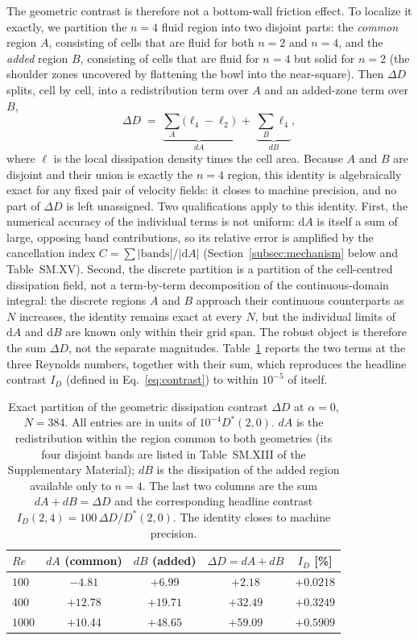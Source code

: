 The geometric contrast is therefore not a bottom-wall friction effect. To localize it exactly, we partition the $n=4$ fluid region into two disjoint parts: the \emph{common} region $A$, consisting of cells that are fluid for both $n=2$ and $n=4$, and the \emph{added} region $B$, consisting of cells that are fluid for $n=4$ but solid for $n=2$ (the shoulder zones uncovered by flattening the bowl into the near-square). Then $\Delta D$ splits, cell by cell, into a redistribution term over $A$ and an added-zone term over $B$,
\begin{equation}
\Delta D \;=\; \underbrace{\sum_{A}\big(\ell_4-\ell_2\big)}_{dA}\;+\;\underbrace{\sum_{B}\ell_4}_{dB},
\end{equation}
where $\ell$ is the local dissipation density times the cell area. Because $A$ and $B$ are disjoint and their union is exactly the $n=4$ region, this identity is algebraically exact for any fixed pair of velocity fields: it closes to machine precision, and no part of $\Delta D$ is left unassigned. Two qualifications apply to this identity. First, the numerical accuracy of the individual terms is not uniform: $\mathrm{d}A$ is itself a sum of large, opposing band contributions, so its relative error is amplified by the cancellation index $C=\sum|\text{bands}|/|\mathrm{d}A|$ (Section~\ref{subsec:mechanism} below and Table~SM.XV). Second, the discrete partition is a partition of the cell-centred dissipation field, not a term-by-term decomposition of the continuous-domain integral: the discrete regions $A$ and $B$ approach their continuous counterparts as $N$ increases, the identity remains exact at every $N$, but the individual limits of $\mathrm{d}A$ and $\mathrm{d}B$ are known only within their grid span. The robust object is therefore the sum $\Delta D$, not the separate magnitudes. Table~\ref{tab:layers} reports the two terms at the three Reynolds numbers, together with their sum, which reproduces the headline contrast $I_D$ (defined in Eq.~\ref{eq:contrast}) to within $10^{-5}$ of itself.

\begin{table}[t]
\centering
\caption{Exact partition of the geometric dissipation contrast $\Delta D$ at $\alpha=0$, $N=384$. All entries are in units of $10^{-4}D^*(2,0)$. $dA$ is the redistribution within the region common to both geometries (its four disjoint bands are listed in Table~SM.XIII of the Supplementary Material); $dB$ is the dissipation of the added region available only to $n=4$. The last two columns are the sum $dA+dB=\Delta D$ and the corresponding headline contrast $I_D(2,4)=100\,\Delta D/D^*(2,0)$. The identity closes to machine precision.}
\label{tab:layers}
\begin{tabular}{@{}lcccc@{}}
\hline
$Re$ & $dA$ (common) & $dB$ (added) & $\Delta D=dA+dB$ & $I_D$ [\%] \\
\hline
$100$  & $-4.81$ & $+6.99$ & $+2.18$ & $+0.0218$ \\
$400$  & $+12.78$ & $+19.71$ & $+32.49$ & $+0.3249$ \\
$1000$ & $+10.44$ & $+48.65$ & $+59.09$ & $+0.5909$ \\
\hline
\end{tabular}
\end{table}

